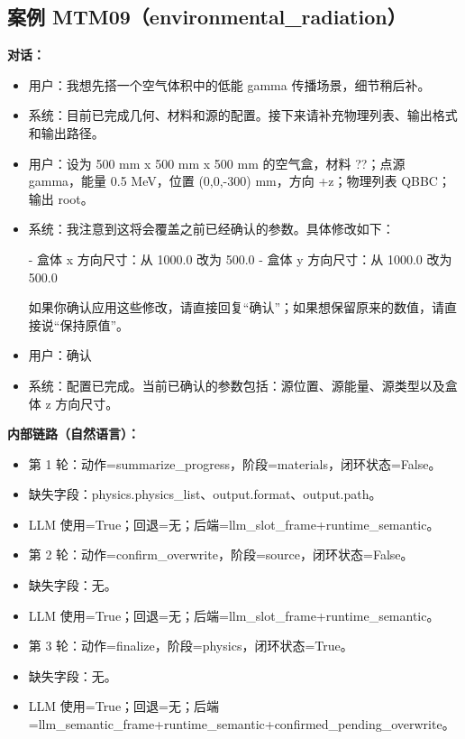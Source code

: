 \documentclass[11pt]{ctexart}
\begin{document}
\subsection{案例 MTM09（environmental\_radiation）}
\textbf{对话：}
\begin{itemize}
\item 用户：我想先搭一个空气体积中的低能 gamma 传播场景，细节稍后补。
\item 系统：目前已完成几何、材料和源的配置。接下来请补充物理列表、输出格式和输出路径。
\item 用户：设为 500 mm x 500 mm x 500 mm 的空气盒，材料 ??；点源 gamma，能量 0.5 MeV，位置 (0,0,-300) mm，方向 +z；物理列表 QBBC；输出 root。
\item 系统：我注意到这将会覆盖之前已经确认的参数。具体修改如下：

- 盒体 x 方向尺寸：从 1000.0 改为 500.0
- 盒体 y 方向尺寸：从 1000.0 改为 500.0

如果你确认应用这些修改，请直接回复“确认”；如果想保留原来的数值，请直接说“保持原值”。
\item 用户：确认
\item 系统：配置已完成。当前已确认的参数包括：源位置、源能量、源类型以及盒体 z 方向尺寸。
\end{itemize}
\textbf{内部链路（自然语言）：}
\begin{itemize}
\item 第 1 轮：动作=summarize\_progress，阶段=materials，闭环状态=False。
\item 缺失字段：physics.physics\_list、output.format、output.path。
\item LLM 使用=True；回退=无；后端=llm\_slot\_frame+runtime\_semantic。
\item 第 2 轮：动作=confirm\_overwrite，阶段=source，闭环状态=False。
\item 缺失字段：无。
\item LLM 使用=True；回退=无；后端=llm\_slot\_frame+runtime\_semantic。
\item 第 3 轮：动作=finalize，阶段=physics，闭环状态=True。
\item 缺失字段：无。
\item LLM 使用=True；回退=无；后端=llm\_semantic\_frame+runtime\_semantic+confirmed\_pending\_overwrite。
\end{itemize}
\end{document}
